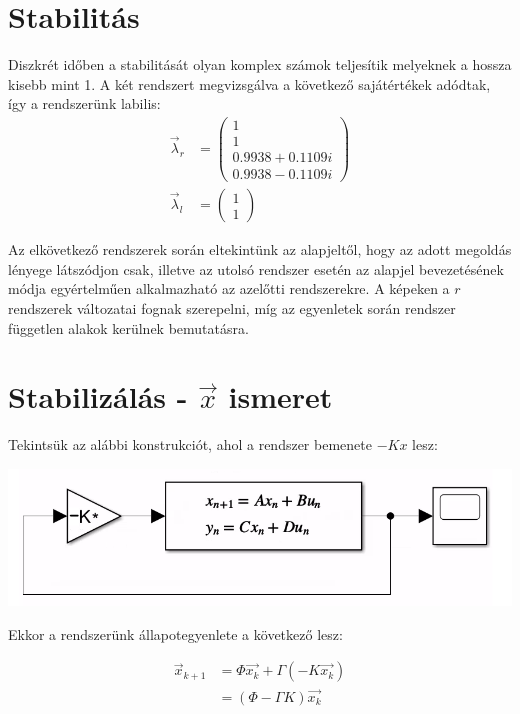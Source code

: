 \documentclass{article}
\begin{document}
\section{Stabilitás}
	Diszkrét időben a stabilitását olyan komplex számok teljesítik melyeknek a hossza kisebb mint 1. A két rendszert megvizsgálva a következő sajátértékek adódtak, így a rendszerünk labilis:
	\begin{align}
		\vec{\lambda}_r & =
		\begin{pmatrix}
			1 \\
			1 \\
			0.9938 + 0.1109i \\
			0.9938 - 0.1109i
		\end{pmatrix} 
        \\
		\vec{\lambda}_l & =
		\begin{pmatrix}
			1 \\
			1
		\end{pmatrix} 
	\end{align}

    Az elkövetkező rendszerek során eltekintünk az alapjeltől, hogy az adott megoldás lényege látszódjon csak, illetve az utolsó rendszer esetén az alapjel bevezetésének módja egyértelműen alkalmazható az azelőtti rendszerekre. A képeken a $r$ rendszerek változatai fognak szerepelni, míg az egyenletek során rendszer független alakok kerülnek bemutatásra.

\section{Stabilizálás - $\vec{x}$ ismeret}
    Tekintsük az alábbi konstrukciót, ahol a rendszer bemenete $-Kx$ lesz:
    
    \begin{center}
        \includegraphics[width=\linewidth/2]{asset/K.png}
    \end{center}

    Ekkor a rendszerünk állapotegyenlete a következő lesz:
    
    \begin{align}
        \vec{x}_{k+1} & = \Phi \vec{x_k} + \Gamma (-K \vec{x_k}) \\
        & =
        (\Phi - \Gamma K)\vec{x_k}     
    \end{align}
\end{document}
